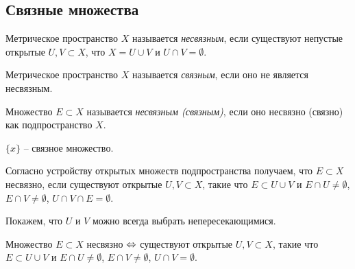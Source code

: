 
\subsection{Связные множества}

\begin{definition}
    Метрическое пространство $X$ называется \textit{несвязным}, если существуют непустые открытые $U, V \subset X$, что $X = U \cup V$ и $U \cap V = \emptyset$.

    Метрическое пространство $X$ называется \textit{связным}, если оно не является несвязным.

    Множество $E \subset X$ называется \textit{несвязным (связным)}, если оно несвязно (связно) как подпространство $X$.
\end{definition}

\begin{example}
    $\{x\}$ -- связное множество.
\end{example}

\begin{note}
    Согласно устройству открытых множеств подпространства получаем, что $E \subset X$ несвязно, если существуют открытые $U, V \subset X$, такие что $E \subset U \cup V$ и $E \cap U \neq \emptyset$, $E \cap V \neq \emptyset$, $U \cap V \cap E = \emptyset$.
\end{note}

Покажем, что $U$ и $V$ можно всегда выбрать непересекающимися.

\begin{lemma}
    Множество $E \subset X$ несвязно $\Leftrightarrow$ существуют открытые $U, V \subset X$, такие что $E \subset U \cup V$ и $E \cap U \neq \emptyset$, $E \cap V \neq \emptyset$, $U \cap V = \emptyset$.
\end{lemma}

